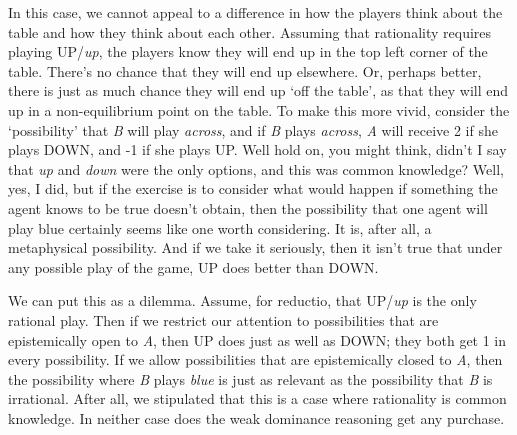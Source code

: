 \documentclass[
  12pt,
  letterpaper,
]{scrbook}
\begin{document}
In this case, we cannot appeal to a difference in how the players think
about the table and how they think about each other. Assuming that
rationality requires playing UP/\emph{up}, the players know they will
end up in the top left corner of the table. There's no chance that they
will end up elsewhere. Or, perhaps better, there is just as much chance
they will end up `off the table', as that they will end up in a
non-equilibrium point on the table. To make this more vivid, consider
the `possibility' that \emph{B} will play \emph{across}, and if \emph{B}
plays \emph{across}, \emph{A} will receive 2 if she plays DOWN, and -1
if she plays UP. Well hold on, you might think, didn't I say that
\emph{up} and \emph{down} were the only options, and this was common
knowledge? Well, yes, I did, but if the exercise is to consider what
would happen if something the agent knows to be true doesn't obtain,
then the possibility that one agent will play blue certainly seems like
one worth considering. It is, after all, a metaphysical possibility. And
if we take it seriously, then it isn't true that under any possible play
of the game, UP does better than DOWN.

We can put this as a dilemma. Assume, for reductio, that UP/\emph{up} is
the only rational play. Then if we restrict our attention to
possibilities that are epistemically open to \emph{A}, then UP does just
as well as DOWN; they both get 1 in every possibility. If we allow
possibilities that are epistemically closed to \emph{A}, then the
possibility where \emph{B} plays \emph{blue} is just as relevant as the
possibility that \emph{B} is irrational. After all, we stipulated that
this is a case where rationality is common knowledge. In neither case
does the weak dominance reasoning get any purchase.
\end{document}

